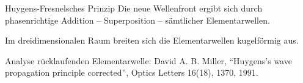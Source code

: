\begin{frame}
\begin{columns}
\begin{column}
\begin{block}{Huygens-Fresnelsches Prinzip}
Die neue Wellenfront ergibt sich durch phasenrichtige Addition -- \alert{Superposition} -- sämtlicher Elementarwellen.

Im dreidimensionalen Raum breiten sich die Elementarwellen \alert{kugelförmig} aus.

{\tiny  Analyse rücklaufenden Elementarwelle:
David A. B. Miller, \enquote{Huygens's wave propagation principle corrected}, Optics Letters 16(18), 1370, 1991.}

\end{block}
\end{column}
\end{columns}

  \end{frame}
  
  
  

   

